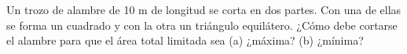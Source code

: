 \item Un trozo de alambre de 10 m de longitud se corta en dos partes. Con una de ellas se forma un cuadrado y con la otra un triángulo equilátero. ¿Cómo debe cortarse el alambre para que el área total limitada sea (a) ¿máxima? (b) ¿mínima?
